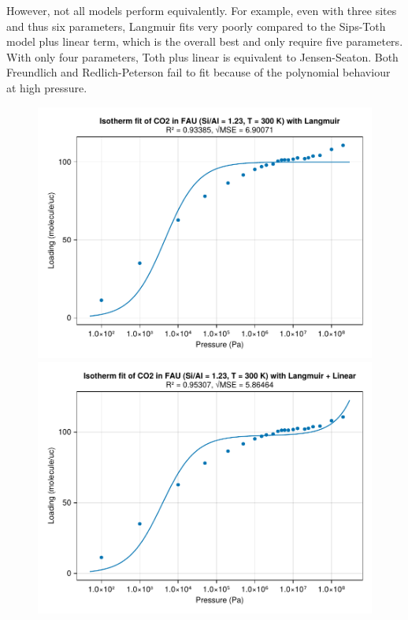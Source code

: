 \documentclass[main.tex]{subfiles}
\begin{document}
However, not all models perform equivalently. For example, even with three sites and thus six parameters, Langmuir fits very poorly compared to the Sips-Toth model plus linear term, which is the overall best and only require five parameters. With only four parameters, Toth plus linear is equivalent to Jensen-Seaton. Both Freundlich and Redlich-Peterson fail to fit because of the polynomial behaviour at high pressure. 

\begin{figure}
	\begin{minipage}{0.49\columnwidth}
		\includegraphics[width=\columnwidth]{figures/isotherms/Langmuir.pdf}
	\end{minipage}\hfill%
	\begin{minipage}{0.49\columnwidth}
		\includegraphics[width=\columnwidth]{figures/isotherms/Langmuir + Linear.pdf}
	\end{minipage}


\end{figure}
\end{document}
